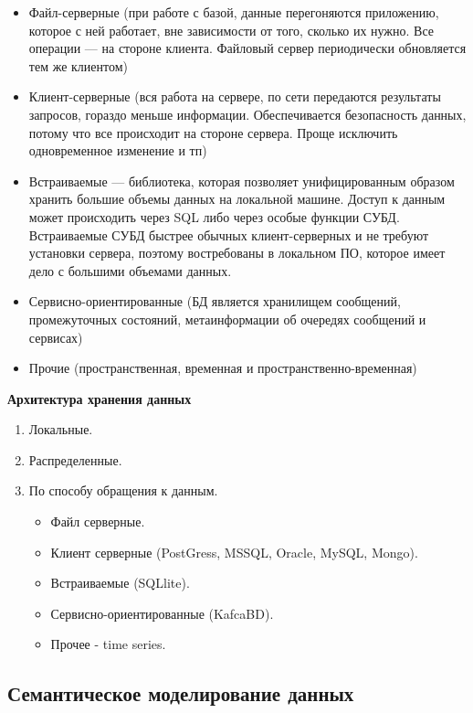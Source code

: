 \begin{enumerate}
\begin{itemize}
		\item Файл-серверные (при работе с базой, данные перегоняются приложению, которое с ней работает, вне зависимости от того, сколько их нужно. Все операции --- на стороне клиента. Файловый сервер периодически обновляется тем же клиентом)
		\item Клиент-серверные (вся работа на сервере, по сети передаются результаты запросов, гораздо меньше информации. Обеспечивается безопасность данных, потому что все происходит на стороне сервера. Проще исключить одновременное изменение и тп)
		\item Встраиваемые --- библиотека, которая позволяет унифицированным образом хранить 
		большие объемы данных на локальной машине. Доступ к данным может происходить через SQL либо через 
		особые функции СУБД. Встраиваемые СУБД быстрее обычных клиент-серверных и не требуют установки 
		сервера, поэтому востребованы в локальном ПО, которое имеет дело с большими объемами данных.
		\item Сервисно-ориентированные  (БД является хранилищем сообщений, промежуточных состояний, метаинформации об очередях сообщений и сервисах)
		\item Прочие (пространственная, временная и пространственно-временная)
	\end{itemize}
\end{enumerate}

\textbf{Архитектура хранения данных}

\begin{enumerate}
	\item Локальные.
	\item Распределенные.
	\item По способу обращения к данным.
	\begin{itemize}
		\item Файл серверные.
		\item Клиент серверные (PostGress, MSSQL, Oracle, MySQL, Mongo).
		\item Встраиваемые (SQLlite).
		\item Сервисно-ориентированные (KafcaBD).
		\item Прочее - time series.
	\end{itemize}
\end{enumerate}

\subsection{Семантическое моделирование данных}

